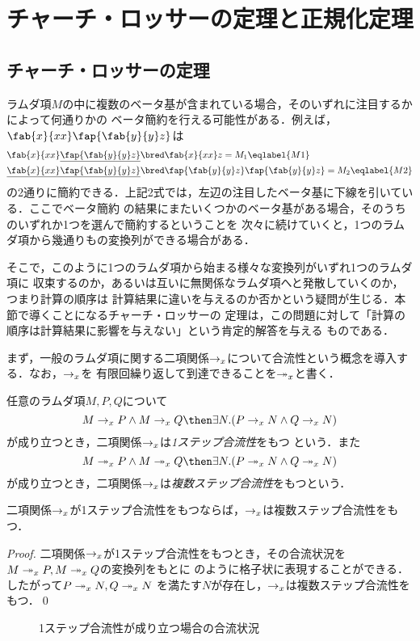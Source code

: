 \documentclass[uplatex,dvipdfmx,report,fleqn]{jsbook}
\begin{document}
\section{チャーチ・ロッサーの定理と正規化定理}

\subsection{チャーチ・ロッサーの定理}

ラムダ項$M$の中に複数のベータ基が含まれている場合，そのいずれに注目するかによって何通りかの
ベータ簡約を行える可能性がある．例えば，$\fab{x}{xx}\fap{\fab{y}{y}z}$は
%
\begin{align}
\fab{x}{xx}\underline{\fap{\fab{y}{y}z}} &\bred \fab{x}{xx}z = M_1 \eqlabel{M1} \\
\underline{\fab{x}{xx}\fap{\fab{y}{y}z}} &\bred \fap{\fab{y}{y}z}\fap{\fab{y}{y}z} = M_2
\eqlabel{M2}
\end{align}
%
の2通りに簡約できる．上記2式では，左辺の注目したベータ基に下線を引いている．ここでベータ簡約
の結果にまたいくつかのベータ基がある場合，そのうちのいずれか1つを選んで簡約するということを
次々に続けていくと，1つのラムダ項から幾通りもの変換列ができる場合がある．

そこで，このように1つのラムダ項から始まる様々な変換列がいずれ1つのラムダ項に
収束するのか，あるいは互いに無関係なラムダ項へと発散していくのか，つまり計算の順序は
計算結果に違いを与えるのか否かという疑問が生じる．本節で導くことになるチャーチ・ロッサーの
定理は，この問題に対して「計算の順序は計算結果に影響を与えない」という肯定的解答を与える
ものである．

まず，一般のラムダ項に関する二項関係$\rightarrow_x$について合流性という概念を導入する．なお，$\rightarrow_x$を
有限回繰り返して到達できることを$\twoheadrightarrow_x$と書く．
%
\begin{definition}[合流性]
任意のラムダ項$M,P,Q$について
\[
M \tox P \land M \tox Q \then \exists N.(P \tox N \land Q \tox N)
\]
が成り立つとき，二項関係$\rightarrow_x$は\emph{1ステップ合流性}をもつ
という．また
\[
M \toxs P \land M \toxs Q \then \exists N.(P \toxs N \land Q \toxs N)
\]
が成り立つとき，二項関係$\rightarrow_x$は\emph{複数ステップ合流性}をもつという．
\end{definition}
%
\begin{lemma}
二項関係$\rightarrow_x$が1ステップ合流性をもつならば，$\rightarrow_x$は複数ステップ合流性をもつ．
\end{lemma}
%
\begin{proof}
二項関係$\rightarrow_x$が1ステップ合流性をもつとき，その合流状況を$M\twoheadrightarrow_x P, M\twoheadrightarrow_x Q$の変換列をもとに
のように格子状に表現することができる．したがって$P \twoheadrightarrow_x N, Q \twoheadrightarrow_x N$
を満たす$N$が存在し，$\rightarrow_x$は複数ステップ合流性をもつ．\qed
\end{proof}
%
\begin{figure}[b]
\centering
{}
\caption{1ステップ合流性が成り立つ場合の合流状況}
\end{figure}
\end{document}
